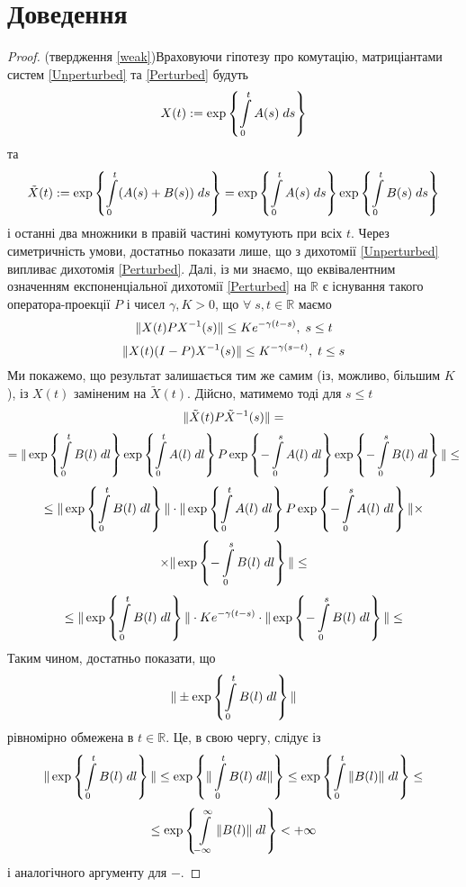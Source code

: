 \documentclass[14pt]{extarticle} %
\let\oldforall\forall
\renewcommand{\forall}{\oldforall\;}
\theoremstyle{remark}
\begin{document}
\section{Доведення}
\begin{proof}{(твердження \ref{weak})}Враховуючи гіпотезу про комутацію, матриціантами систем \eqref{Unperturbed} та \eqref{Perturbed} будуть
	\[X(t):=\exp\mycbra{\int_0^tA(s)\;ds}\]
	та \[\tilde{X}(t):=\exp\mycbra{\int_0^t(A(s)+B(s))\;ds}=\exp\mycbra{\int_0^tA(s)\;ds}\exp\mycbra{\int_0^tB(s)\;ds}\]
	і останні два множники в правій частині комутують при всіх $t$.
	Через симетричність умови, достатньо показати лише, що з дихотомії \eqref{Unperturbed} випливає дихотомія \eqref{Perturbed}.
	Далі, із \cite{coppel} ми знаємо, що еквівалентним означенням експоненціальної дихотомії \eqref{Perturbed}
	на $\mathbb{R}$ є існування
	такого оператора-проекції $P$ і чисел $\gamma,K>0$, що $\forall s,t\in\mathbb{R}$ маємо
	\[\|X(t)PX^{-1}(s)\|\leq Ke^{-\gamma(t-s)},\;s\leq t\]
	\[\|X(t)(I-P)X^{-1}(s)\|\leq K^{-\gamma(s-t)},\;t\leq s\]
	Ми покажемо, що результат залишається тим же самим (із, можливо, більшим $K$), із $X(t)$ заміненим на $\tilde{X}(t)$.
	Дійсно, матимемо тоді для $s\leq t$
	\[\|\tilde{X}(t)P\tilde{X}^{-1}(s)\|=\]
	\[=\mynorm{\exp\mycbra{\int_0^tB(l)\;dl}\exp\mycbra{\int_0^tA(l)\;dl}P\exp\mycbra{-\int_0^sA(l)\;dl}
	\exp\mycbra{-\int_0^sB(l)\;dl}}\leq\]
	\[\leq\mynorm{\exp\mycbra{\int_0^tB(l)\;dl}}\cdot\mynorm{\exp\mycbra{\int_0^tA(l)\;dl}P\exp\mycbra{-\int_0^sA(l)\;dl}}\times
	\]\[\times\mynorm{\exp\mycbra{-\int_0^sB(l)\;dl}}\leq\]
	\[\leq\mynorm{\exp\mycbra{\int_0^tB(l)\;dl}}\cdot Ke^{-\gamma(t-s)}\cdot
	\mynorm{\exp\mycbra{-\int_0^sB(l)\;dl}}\leq\]
	Таким чином, достатньо показати, що
	\[\mynorm{\pm\exp\mycbra{\int_0^tB(l)\;dl}}\]
	рівномірно обмежена в $t\in\mathbb{R}$. Це, в свою чергу, слідує із
	\[\mynorm{\exp\mycbra{\int_0^tB(l)\;dl}}\leq\exp\mycbra{\mynorm{\int_0^tB(l)\;dl}}\leq\exp\mycbra{\int_0^t\mynorm{B(l)}\;dl
	}\leq\]
	\[\leq\exp\mycbra{\int_{-\infty}^{\infty}\mynorm{B(l)}\;dl}<+\infty\]
	і аналогічного аргументу для $-$.
\end{proof}
\end{document}

